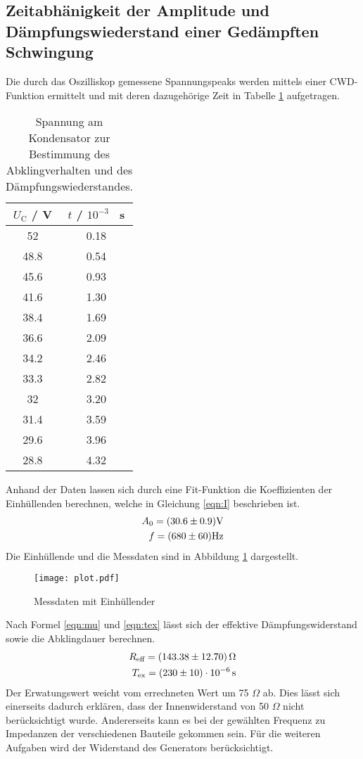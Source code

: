 \subsection{Zeitabhänigkeit der Amplitude und Dämpfungswiederstand einer Gedämpften Schwingung}
Die durch das Oszilliskop gemessene Spannungspeaks werden mittels einer CWD-Funktion ermittelt und mit deren dazugehörige Zeit in Tabelle \ref{tab:U_C} aufgetragen.
\begin{table}
  \centering
  \begin{tabular}{c c}
    \toprule
    	$U_\text{C}$ / V & $t$ / $10^{-3}$ \, s\\
    \midrule
	52	& 0.18	\\
	48.8	& 0.54	\\
	45.6	& 0.93 	\\
	41.6	& 1.30	\\
	38.4	& 1.69	\\
	36.6	& 2.09 	\\
	34.2	& 2.46	\\
	33.3 	& 2.82	\\
	32	& 3.20 	\\
	31.4	& 3.59	\\
	29.6	& 3.96	\\
	28.8	& 4.32 	\\
    \bottomrule
  \end{tabular}
  \caption{Spannung am Kondensator zur Bestimmung des Abklingverhalten und des Dämpfungswiederstandes.}
  \label{tab:U_C}
\end{table}
Anhand der Daten lassen sich durch eine Fit-Funktion die Koeffizienten der Einhüllenden berechnen, welche in Gleichung \ref{eqn:I} beschrieben ist.
\begin{eqnarray}
  A_0 = ( \num{30.6 +- 0.9} ) \text{V} \\
  f = ( \num{680 +- 60} ) \text{Hz}
  \label{eqn:Koef}
\end{eqnarray}
Die Einhüllende und die Messdaten sind in Abbildung \ref{fig:Osz} dargestellt.
\begin{figure}
  \centering
  \texttt{[image: plot.pdf]}
  \caption{Messdaten mit Einhüllender}
  \label{fig:Osz}
\end{figure}
Nach Formel \ref{eqn:mu} und \ref{eqn:tex} lässt sich der effektive Dämpfungswiderstand sowie die Abklingdauer berechnen.
\begin{eqnarray}
  R_\text{eff} = ( \num{143.38 +- 12.7}) \, \Omega \\
  T_\text{ex} = ( \num{230 +- 10}) \cdot 10^{-6} \, \text{s}
  \label{eqn:Reff}
\end{eqnarray}
Der Erwatungswert weicht vom errechneten Wert um 75 $\Omega$ ab. Dies lässt sich einerseits dadurch erklären, dass der Innenwiderstand von 50 $\Omega$ nicht berücksichtigt wurde. Andererseits kann es bei der gewählten Frequenz zu Impedanzen der verschiedenen Bauteile gekommen sein. Für die weiteren Aufgaben wird der Widerstand des Generators berücksichtigt.
